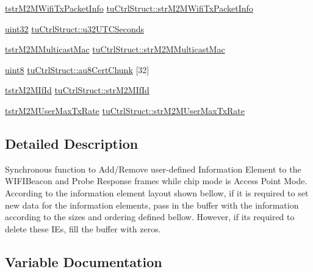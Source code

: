 \begin{DoxyCompactItemize}
\item 
\hyperlink{structtstrM2MWifiTxPacketInfo}{tstr\+M2\+M\+Wifi\+Tx\+Packet\+Info} \hyperlink{group__WifiSetCustInfoElementFn_gaa1754f14e37a56c5ae27a82273523c0f}{tu\+Ctrl\+Struct\+::str\+M2\+M\+Wifi\+Tx\+Packet\+Info}
\item 
\hyperlink{group__DataT_ga100e7c691a47d6978527c479a0158245}{uint32} \hyperlink{group__WifiSetCustInfoElementFn_ga1f606ddf58bcc3b277df02eba2bcddd0}{tu\+Ctrl\+Struct\+::u32\+U\+T\+C\+Seconds}
\item 
\hyperlink{structtstrM2MMulticastMac}{tstr\+M2\+M\+Multicast\+Mac} \hyperlink{group__WifiSetCustInfoElementFn_ga324d83a2db53ecf43f9f1192bfb44b32}{tu\+Ctrl\+Struct\+::str\+M2\+M\+Multicast\+Mac}
\item 
\hyperlink{group__DataT_ga4df709a77647e870bbf1d955b8edc9a6}{uint8} \hyperlink{group__WifiSetCustInfoElementFn_gade8c3edfe384c40d854409e4b77576e4}{tu\+Ctrl\+Struct\+::au8\+Cert\+Chunk} \mbox{[}32\mbox{]}
\item 
\hyperlink{structtstrM2MIfId}{tstr\+M2\+M\+If\+Id} \hyperlink{group__WifiSetCustInfoElementFn_ga2e24fb5862f4b27ee61f92a5376ee298}{tu\+Ctrl\+Struct\+::str\+M2\+M\+If\+Id}
\item 
\hyperlink{structtstrM2MUserMaxTxRate}{tstr\+M2\+M\+User\+Max\+Tx\+Rate} \hyperlink{group__WifiSetCustInfoElementFn_gab96ecff463075c0ed919fa6005eed011}{tu\+Ctrl\+Struct\+::str\+M2\+M\+User\+Max\+Tx\+Rate}
\end{DoxyCompactItemize}


\subsection{Detailed Description}
Synchronous function to Add/\+Remove user-\/defined Information Element to the W\+I\+F\+I\+Beacon and Probe Response frames while chip mode is Access Point Mode. According to the information element layout shown bellow, if it is required to set new data for the information elements, pass in the buffer with the information according to the sizes and ordering defined bellow. However, if it\textquotesingle{}s required to delete these I\+Es, fill the buffer with zeros. 

\subsection{Variable Documentation}
\mbox{\label{group__WifiSetCustInfoElementFn_ga6f70ecd991f703463e35811a52a44b8d}} 
